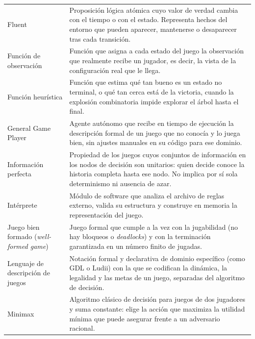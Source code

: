 \begin{longtable}[l]{
    @{}
    >{\raggedright\arraybackslash}p{4.2cm}
    p{\dimexpr\textwidth-4.2cm-2\tabcolsep\relax}
    @{}
    }
    Fluent
                     &
    Proposición lógica atómica cuyo valor de verdad cambia con el tiempo o con el estado. Representa hechos del entorno que pueden aparecer, mantenerse o desaparecer tras cada transición.
    \\

    Función de observación
                     &
    Función que asigna a cada estado del juego la observación que realmente recibe un jugador, es decir, la vista de la configuración real que le llega.
    \\

    Función heurística
                     &
    Función que estima qué tan bueno es un estado no terminal, o qué tan cerca está de la victoria, cuando la explosión combinatoria impide explorar el árbol hasta el final.
    \\

    General Game Player
                     &
    Agente autónomo que recibe en tiempo de ejecución la descripción formal de un juego que no conocía y lo juega bien, sin ajustes manuales en su código para ese dominio.
    \\

    Información perfecta
                     &
    Propiedad de los juegos cuyos conjuntos de información en los nodos de decisión son unitarios: quien decide conoce la historia completa hasta ese nodo. No implica por sí sola determinismo ni ausencia de azar.
    \\

    Intérprete
                     &
    Módulo de software que analiza el archivo de reglas externo, valida su estructura y construye en memoria la representación del juego.
    \\

    Juego bien formado (\textit{well-formed game})
                     &
    Juego formal que cumple a la vez con la jugabilidad (no hay bloqueos o \textit{deadlocks}) y con la terminación garantizada en un número finito de jugadas.
    \\

    Lenguaje de descripción de juegos
                     &
    Notación formal y declarativa de dominio específico (como GDL o Ludii) con la que se codifican la dinámica, la legalidad y las metas de un juego, separadas del algoritmo de decisión.
    \\

    Minimax
                     &
    Algoritmo clásico de decisión para juegos de dos jugadores y suma constante: elige la acción que maximiza la utilidad mínima que puede asegurar frente a un adversario racional.
    \\


\end{longtable}
